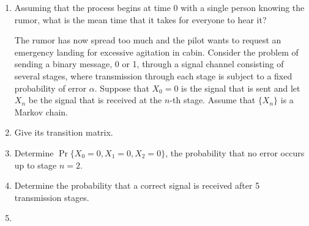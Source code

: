 \documentclass[article,12pt,a4paper]{article}
\begin{document}
	\begin{enumerate}
		\item Assuming that the process begins at time 0 with a single person knowing the rumor, what is the mean time that it takes for everyone to hear it?
		
		
		
		The rumor has now spread too much and the pilot wants to request an emergency landing for excessive agitation in cabin.
		Consider the problem of sending a binary message, 0 or 1, through a signal
		channel consisting of several stages, where transmission through each stage is
		subject to a fixed probability of error $\alpha$. Suppose that $X_0 = 0$ is the signal that is
		sent and let $X_n$ be the signal that is received at the $n$-th stage. Assume that $\{X_n\}$ is a Markov chain.
		\item Give its transition matrix.
		
		\item Determine $\Pr\{X_0 = 0, X_1 = 0, X_2 = 0\}$, the probability that no error occurs up to stage $n = 2$.
		
		\item Determine the probability that a correct signal is received after 5 transmission stages.
		
		\item 
	\end{enumerate}
	\fi
	
	
\end{document}
